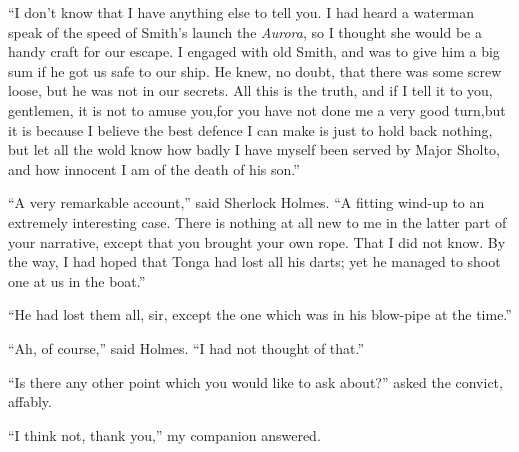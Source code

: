 \documentclass[12pt,english,oneside]{book}
\begin{document}
{}``I don't know that I have anything else to tell you. I had heard
a waterman speak of the speed of Smith's launch the \emph{Aurora},
so I thought she would be a handy craft for our escape. I engaged
with old Smith, and was to give him a big sum if he got us safe to
our ship. He knew, no doubt, that there was some screw loose, but
he was not in our secrets. All this is the truth, and if I tell it
to you, gentlemen, it is not to amuse you,\mdsh{---}for you have
not done me a very good turn,\mdsh{---}but it is because I believe
the best defence I can make is just to hold back nothing, but let
all the wold know how badly I have myself been served by Major Sholto,
and how innocent I am of the death of his son.''

{}``A very remarkable account,'' said Sherlock Holmes. {}``A fitting
wind-up to an extremely interesting case. There is nothing at all
new to me in the latter part of your narrative, except that you brought
your own rope. That I did not know. By the way, I had hoped that Tonga
had lost all his darts; yet he managed to shoot one at us in the boat.''

{}``He had lost them all, sir, except the one which was in his blow-pipe
at the time.''

{}``Ah, of course,'' said Holmes. {}``I had not thought of that.''

{}``Is there any other point which you would like to ask about?''
asked the convict, affably.

{}``I think not, thank you,'' my companion answered.
\end{document}
